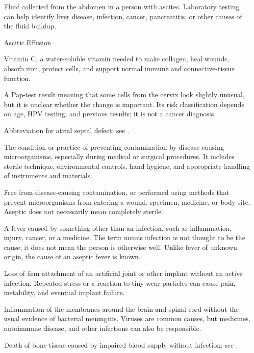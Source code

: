  Fluid collected from the abdomen in a person with ascites. Laboratory testing can help identify liver disease, infection, cancer, pancreatitis, or other causes of the fluid buildup.

\synonyms
Ascitic Effusion

 Vitamin C, a water-soluble vitamin needed to make collagen, heal wounds, absorb iron, protect cells, and support normal immune and connective-tissue function.

 A Pap-test result meaning that some cells from the cervix look slightly unusual, but it is unclear whether the change is important. Its risk classification depends on age, HPV testing, and previous results; it is not a cancer diagnosis.

 Abbreviation for atrial septal defect; see .

 The condition or practice of preventing contamination by disease-causing microorganisms, especially during medical or surgical procedures. It includes sterile technique, environmental controls, hand hygiene, and appropriate handling of instruments and materials.

 Free from disease-causing contamination, or performed using methods that prevent microorganisms from entering a wound, specimen, medicine, or body site. Aseptic does not necessarily mean completely sterile.

 A fever caused by something other than an infection, such as inflammation, injury, cancer, or a medicine. The term means infection is not thought to be the cause; it does not mean the person is otherwise well. Unlike fever of unknown origin, the cause of an aseptic fever is known.

 Loss of firm attachment of an artificial joint or other implant without an active infection. Repeated stress or a reaction to tiny wear particles can cause pain, instability, and eventual implant failure.

 Inflammation of the membranes around the brain and spinal cord without the usual evidence of bacterial meningitis. Viruses are common causes, but medicines, autoimmune disease, and other infections can also be responsible.

 Death of bone tissue caused by impaired blood supply without infection; see .

